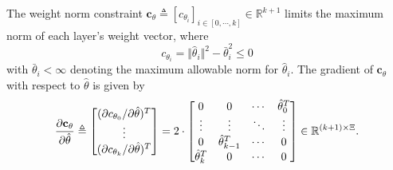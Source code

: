\documentclass[lettersize,journal]{IEEEtran}
\newtheorem{remark}{Remark}
\begin{document}
The weight norm constraint $\mathbf{c}_{\theta}\triangleq [c_{\theta_i}]_{i\in[0,\cdots ,k]}\in\mathbb R^{k+1}$ limits the maximum norm of each layer's weight vector, where
\begin{equation}
    c_{\theta_i}=\Vert \hat\theta_i\Vert^2 -\bar\theta_i^2 \le 0
    \label{eq. cstr weight ball}
\end{equation}
with $\bar\theta_i<\infty$ denoting the maximum allowable norm for $\hat\theta_i$. 
The gradient of $\mathbf{c}_\theta$ with respect to $\hat\theta$ is given by
\begin{equation}\label{eq weight norm cnst grad}
    {\partial \mathbf c_\theta \over \partial \hat\theta}
    \triangleq
    \begin{bmatrix}
        (\partial c_{\theta_0}/\partial \hat\theta)^T
        \\ 
        \vdots 
        \\
        (\partial c_{\theta_k}/\partial \hat\theta)^T
    \end{bmatrix}
    = 2\cdot 
    \begin{bmatrix}
        0&0&\cdots & \hat\theta_0^T\\
        \vdots&\vdots&\ddots&\vdots\\
        0&\hat\theta^T_{k-1}&\cdots &0\\
        \hat\theta^T_k&0&\cdots &0
    \end{bmatrix}
    \in\mathbb R^{(k+1)\times\Xi}
    .
\end{equation}

\end{document}
